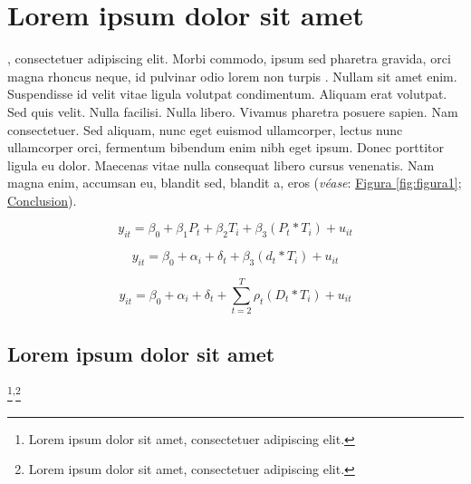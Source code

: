 \chapter{Lorem ipsum dolor sit amet}
\label{chap:capitulo2}

, consectetuer adipiscing elit. Morbi commodo, ipsum sed pharetra gravida, orci magna rhoncus neque, id pulvinar odio lorem non turpis \citep[Chap.~5]{angrist2015}. Nullam sit amet enim. Suspendisse id velit vitae ligula volutpat condimentum. Aliquam erat volutpat. Sed quis velit. Nulla facilisi. Nulla libero. Vivamus pharetra posuere sapien. Nam consectetuer. Sed aliquam, nunc eget euismod ullamcorper, lectus nunc ullamcorper orci, fermentum bibendum enim nibh eget ipsum. Donec porttitor ligula eu dolor. Maecenas vitae nulla consequat libero cursus venenatis. Nam magna enim, accumsan eu, blandit sed, blandit a, eros (\emph{véase}: \hyperref[fig:figura1]{Figura \ref{fig:figura1}}; \hyperref[chap:conclusion]{Conclusion}).

\begin{equation}
	y_{it} = \beta_0 + \beta_1 P_t + \beta_2 T_i + \beta_3 (P_t * T_i) + u_{it}
\end{equation}

\begin{equation}
	y_{it} = \beta_0 + \alpha_i + \delta_t + \beta_3 (d_t * T_i) + u_{it}
\end{equation}

\begin{equation}
	y_{it} = \beta_0 + \alpha_i + \delta_t + \sum_{t=2}^{T} \rho_t (D_t * T_i) + u_{it}
\end{equation}


\section{Lorem ipsum dolor sit amet}

\lipsum[2]\footnote{Lorem ipsum dolor sit amet, consectetuer adipiscing elit.}\textsuperscript{,}\footnote{Lorem ipsum dolor sit amet, consectetuer adipiscing elit.}

